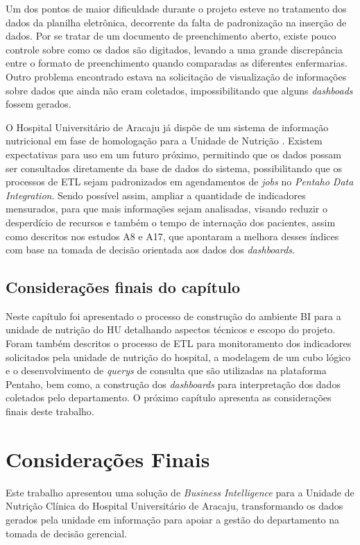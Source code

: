 Um dos pontos de maior dificuldade durante o projeto esteve no tratamento dos dados da planilha eletrônica, decorrente da falta de padronização na inserção de dados. Por se tratar de um documento de preenchimento aberto, existe pouco controle sobre como os dados são digitados, levando a uma grande discrepância entre o formato de preenchimento quando comparadas as diferentes enfermarias. Outro problema encontrado estava na solicitação de visualização de informações sobre dados que ainda não eram coletados, impossibilitando que alguns \textit{dashboads} fossem gerados.

O Hospital Universitário de Aracaju já dispõe de um sistema de informação nutricional em fase de homologação para a Unidade de Nutrição \cite{crisnaldo2020}. Existem expectativas para uso em um futuro próximo, permitindo que os dados possam ser consultados diretamente da base de dados do sistema, possibilitando que os processos de ETL sejam padronizados em agendamentos de \textit{jobs} no \textit{Pentaho Data Integration}. Sendo possível assim, ampliar a quantidade de indicadores mensurados, para que mais informações sejam analisadas, visando reduzir o desperdício de recursos e também o tempo de internação dos pacientes, assim como descritos nos estudos A8 e A17, que apontaram a melhora desses índices com base na tomada de decisão orientada aos dados dos \textit{dashboards}.

\section{Considerações finais do capítulo}
Neste capítulo foi apresentado o processo de construção do ambiente BI para a unidade de nutrição do HU detalhando aspectos técnicos e escopo do projeto. Foram também descritos o processo de ETL para monitoramento dos indicadores solicitados pela unidade de nutrição do hospital, a modelagem de um cubo lógico e o desenvolvimento de \textit{querys} de consulta que são utilizadas na plataforma Pentaho, bem como, a construção dos \textit{dashboards} para interpretação dos dados coletados pelo departamento. O próximo capítulo apresenta as considerações finais deste trabalho.


\chapter{Considerações Finais}
Este trabalho apresentou uma solução de \textit{Business Intelligence} para a Unidade de Nutrição Clínica do Hospital Universitário de Aracaju, transformando os dados gerados pela unidade em informação para apoiar a gestão do departamento na tomada de decisão gerencial.

